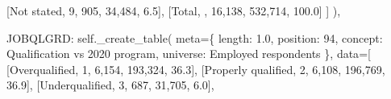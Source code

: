 \documentclass[
  11pt,
  a4paper,
]{article}
\newenvironment{Shaded}{\begin{snugshade}}{\end{snugshade}}
\newcommand{\NormalTok}[1]{\textcolor[rgb]{0.00,0.23,0.31}{#1}}
\newcommand{\OperatorTok}[1]{\textcolor[rgb]{0.37,0.37,0.37}{#1}}
\newcommand{\StringTok}[1]{\textcolor[rgb]{0.13,0.47,0.30}{#1}}
\newcommand{\VariableTok}[1]{\textcolor[rgb]{0.07,0.07,0.07}{#1}}
\begin{document}
\begin{Shaded}
\begin{Highlighting}[]
\NormalTok{            [}\StringTok{\textquotesingle{}Not stated\textquotesingle{}}\NormalTok{, }\StringTok{\textquotesingle{}9\textquotesingle{}}\NormalTok{, }\StringTok{\textquotesingle{}905\textquotesingle{}}\NormalTok{, }\StringTok{\textquotesingle{}34,484\textquotesingle{}}\NormalTok{, }\StringTok{\textquotesingle{}6.5\textquotesingle{}}\NormalTok{],}
\NormalTok{            [}\StringTok{\textquotesingle{}Total\textquotesingle{}}\NormalTok{, }\StringTok{\textquotesingle{}\textquotesingle{}}\NormalTok{, }\StringTok{\textquotesingle{}16,138\textquotesingle{}}\NormalTok{, }\StringTok{\textquotesingle{}532,714\textquotesingle{}}\NormalTok{, }\StringTok{\textquotesingle{}100.0\textquotesingle{}}\NormalTok{]}
\NormalTok{        ]}
\NormalTok{    ),}

    \StringTok{\textquotesingle{}JOBQLGRD\textquotesingle{}}\NormalTok{: }\VariableTok{self}\NormalTok{.\_create\_table(}
\NormalTok{        meta}\OperatorTok{=}\NormalTok{\{}
            \StringTok{\textquotesingle{}length\textquotesingle{}}\NormalTok{: }\StringTok{\textquotesingle{}1.0\textquotesingle{}}\NormalTok{, }\StringTok{\textquotesingle{}position\textquotesingle{}}\NormalTok{: }\StringTok{\textquotesingle{}94\textquotesingle{}}\NormalTok{,}
            \StringTok{\textquotesingle{}concept\textquotesingle{}}\NormalTok{: }\StringTok{\textquotesingle{}Qualification vs 2020 program\textquotesingle{}}\NormalTok{,}
            \StringTok{\textquotesingle{}universe\textquotesingle{}}\NormalTok{: }\StringTok{\textquotesingle{}Employed respondents\textquotesingle{}}
\NormalTok{        \},}
\NormalTok{        data}\OperatorTok{=}\NormalTok{[}
\NormalTok{            [}\StringTok{\textquotesingle{}Overqualified\textquotesingle{}}\NormalTok{, }\StringTok{\textquotesingle{}1\textquotesingle{}}\NormalTok{, }\StringTok{\textquotesingle{}6,154\textquotesingle{}}\NormalTok{, }\StringTok{\textquotesingle{}193,324\textquotesingle{}}\NormalTok{, }\StringTok{\textquotesingle{}36.3\textquotesingle{}}\NormalTok{],}
\NormalTok{            [}\StringTok{\textquotesingle{}Properly qualified\textquotesingle{}}\NormalTok{, }\StringTok{\textquotesingle{}2\textquotesingle{}}\NormalTok{, }\StringTok{\textquotesingle{}6,108\textquotesingle{}}\NormalTok{, }\StringTok{\textquotesingle{}196,769\textquotesingle{}}\NormalTok{, }\StringTok{\textquotesingle{}36.9\textquotesingle{}}\NormalTok{],}
\NormalTok{            [}\StringTok{\textquotesingle{}Underqualified\textquotesingle{}}\NormalTok{, }\StringTok{\textquotesingle{}3\textquotesingle{}}\NormalTok{, }\StringTok{\textquotesingle{}687\textquotesingle{}}\NormalTok{, }\StringTok{\textquotesingle{}31,705\textquotesingle{}}\NormalTok{, }\StringTok{\textquotesingle{}6.0\textquotesingle{}}\NormalTok{],}

\end{Highlighting}
\end{Shaded}
\end{document}
